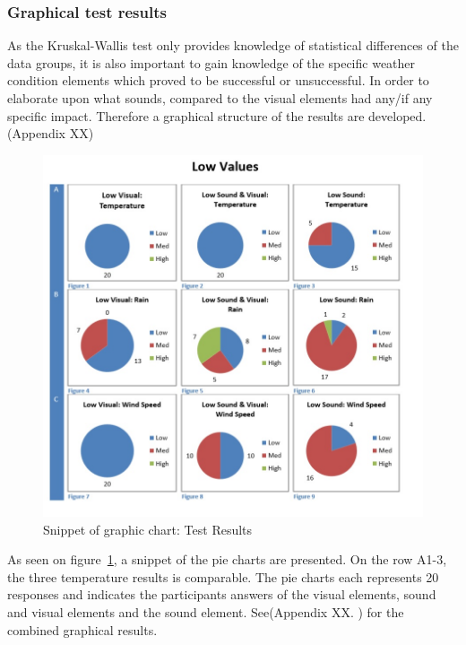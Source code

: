 


\subsubsection{Graphical test results} %
\label{ssub:graphical_test_results}

As the Kruskal-Wallis test only provides knowledge of statistical differences of the data groups, it is also important to gain knowledge of the specific weather condition elements which proved to be successful or unsuccessful. 
In order to elaborate upon what sounds, compared to the visual elements had any/if any specific impact. 
Therefore a graphical structure of the results are developed. (Appendix XX)

\begin{figure}[!htbp]
    \centering
    \includegraphics[width=.7\textwidth]{images/Evaluation4.jpg}
    \caption{Snippet of graphic chart: Test Results}
    \label{fig:evaluation4}
\end{figure}

As seen on figure~\ref{fig:evaluation4}, a snippet of the pie charts are presented. 
On the row A1-3, the three temperature results is comparable. 
The pie charts each represents 20 responses and indicates the participants answers of the visual elements, sound and visual elements and the sound element. 
See(Appendix XX. ) for the combined graphical results.




